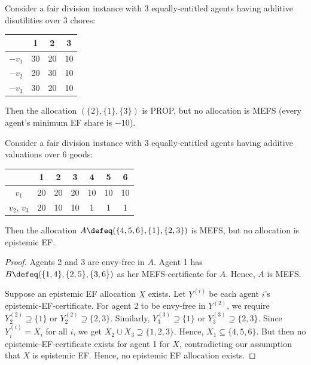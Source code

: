 \begin{example}
\label{cex:prop-not-mefs-chores}
Consider a fair division instance with 3 equally-entitled agents
having additive disutilities over 3 chores:

\begin{tabular}{c|ccc}
& 1 & 2 & 3
\\ \hline $-v_1$ & 30 & 20 & 10
\\ $-v_2$ & 20 & 30 & 10
\\ $-v_3$ & 30 & 20 & 10
\end{tabular}

Then the allocation $(\{2\}, \{1\}, \{3\})$ is PROP, but no allocation is MEFS
(every agent's minimum EF share is $-10$).
\end{example}

\begin{lemma}
\label{cex:mefs-not-eef-goods}
Consider a fair division instance with 3 equally-entitled agents
having additive valuations over 6 goods:

\begin{tabular}{c|cccccc}
& 1 & 2 & 3 & 4 & 5 & 6
\\ \hline $v_1$ & 20 & 20 & 20 & 10 & 10 & 10
\\ $v_2$, $v_3$ & 20 & 10 & 10 &  1 &  1 &  1
\end{tabular}

Then the allocation $A \defeq (\{4, 5, 6\}, \{1\}, \{2, 3\})$ is MEFS, but no allocation is epistemic EF.
\end{lemma}
\begin{proof}
Agents 2 and 3 are envy-free in $A$.
Agent 1 has $B \defeq (\{1, 4\}, \{2, 5\}, \{3, 6\})$ as her MEFS-certificate for $A$.
Hence, $A$ is MEFS.

Suppose an epistemic EF allocation $X$ exists.
Let $Y^{(i)}$ be each agent $i$'s epistemic-EF-certificate.
For agent 2 to be envy-free in $Y^{(2)}$,
we require $Y^{(2)}_2 \supseteq \{1\}$ or $Y^{(2)}_2 \supseteq \{2, 3\}$.
Similarly, $Y^{(3)}_3 \supseteq \{1\}$ or $Y^{(3)}_3 \supseteq \{2, 3\}$.
Since $Y^{(i)}_i = X_i$ for all $i$, we get $X_2 \cup X_3 \supseteq \{1, 2, 3\}$.
Hence, $X_1 \subseteq \{4, 5, 6\}$.
But then no epistemic-EF-certificate exists for agent 1 for $X$,
contradicting our assumption that $X$ is epistemic EF.
Hence, no epistemic EF allocation exists.
\end{proof}

